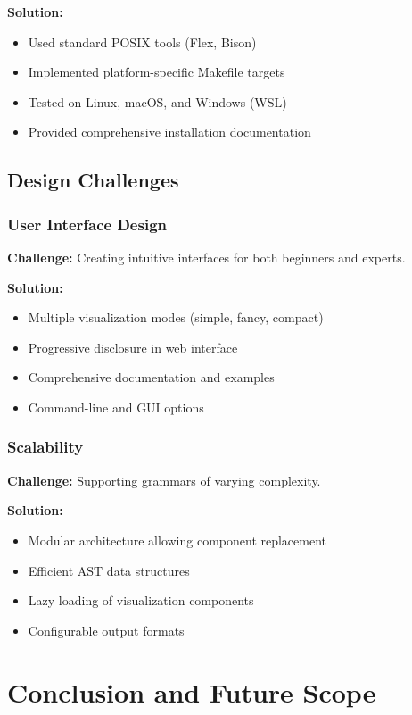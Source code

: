 \documentclass[a4paper,12pt]{report}
\begin{document}
\textbf{Solution:}
\begin{itemize}
    \item Used standard POSIX tools (Flex, Bison)
    \item Implemented platform-specific Makefile targets
    \item Tested on Linux, macOS, and Windows (WSL)
    \item Provided comprehensive installation documentation
\end{itemize}

\section{Design Challenges}

\subsection{User Interface Design}
\textbf{Challenge:} Creating intuitive interfaces for both beginners and experts.

\textbf{Solution:}
\begin{itemize}
    \item Multiple visualization modes (simple, fancy, compact)
    \item Progressive disclosure in web interface
    \item Comprehensive documentation and examples
    \item Command-line and GUI options
\end{itemize}

\subsection{Scalability}
\textbf{Challenge:} Supporting grammars of varying complexity.

\textbf{Solution:}
\begin{itemize}
    \item Modular architecture allowing component replacement
    \item Efficient AST data structures
    \item Lazy loading of visualization components
    \item Configurable output formats
\end{itemize}

\newpage

\chapter{Conclusion and Future Scope}
\thispagestyle{contentpages}
\justifying
\end{document}
